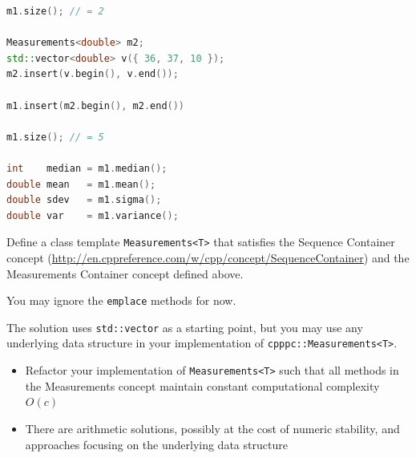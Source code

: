 \begin{homeworkProblem}
\begin{lstlisting}[language=C++]
m1.size(); // = 2

Measurements<double> m2;
std::vector<double> v({ 36, 37, 10 });
m2.insert(v.begin(), v.end());

m1.insert(m2.begin(), m2.end())

m1.size(); // = 5

int    median = m1.median();
double mean   = m1.mean();
double sdev   = m1.sigma();
double var    = m1.variance();
\end{lstlisting}

Define a class template \texttt{Measurements<T>} that satisfies the Sequence Container concept (\url{http://en.cppreference.com/w/cpp/concept/SequenceContainer}) and the Measurements Container concept defined above.

You may ignore the \texttt{emplace} methods for now.

The solution uses \texttt{std::vector} as a starting point, but you may use any underlying data structure in your implementation of \texttt{cpppc::Measurements<T>}.
\end{homeworkProblem}
\begin{homeworkProblem}
    \begin{itemize}
        \item Refactor your implementation of \texttt{Measurements<T>} such that all methods in the Measurements concept maintain constant computational complexity $O(c)$
        \item There are arithmetic solutions, possibly at the cost of numeric stability, and approaches focusing on the underlying data structure
    \end{itemize}
\end{homeworkProblem}




